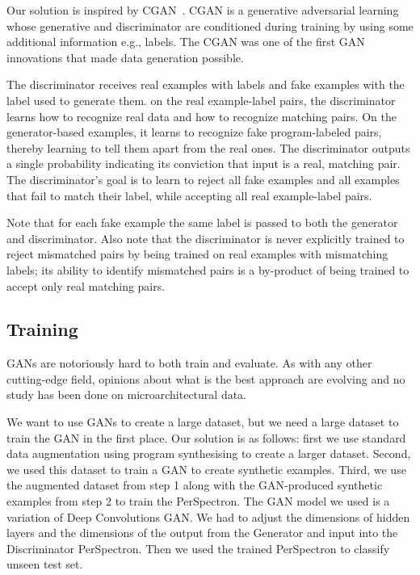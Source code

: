  Our solution is inspired by CGAN~\cite{cgan}. CGAN is a generative adversarial learning whose generative and discriminator are conditioned during training by using some additional information e.g., labels. The CGAN was one of the first GAN innovations that made data generation possible. 
 
 
 
 
 The discriminator receives real examples with labels and fake examples with the label used to generate them. on the real example-label pairs, the discriminator learns how to recognize real data and how to recognize matching pairs. On the generator-based examples, it learns to recognize fake program-labeled pairs, thereby learning to tell them apart from the real ones. The discriminator outputs a single probability indicating its conviction that input is a real, matching pair. The discriminator's goal is to learn to reject all fake examples and all examples that fail to match their label, while accepting all real example-label pairs. 
 
 Note that for each fake example the same label is passed to both the generator and discriminator. Also note that the discriminator is never explicitly trained to reject mismatched pairs by being trained on real examples with mismatching labels; its ability to identify mismatched pairs is a by-product of being trained to accept only real matching pairs. 
 

\subsection{Training}
GANs are notoriously hard to both train and evaluate. As with any other cutting-edge field, opinions about what is the best approach are evolving and no study has been done on microarchitectural data. 

We want to use GANs to create a large dataset, but we need a large dataset to train the GAN in the first place. 
Our solution is as follows:
first we use standard data augmentation using program synthesising to create a larger dataset. Second, we used this dataset to train a GAN to create synthetic examples. Third, we use the augmented dataset from step 1 along with the GAN-produced synthetic examples from step 2 to train the PerSpectron. The GAN model we used is a variation of Deep Convolutions GAN. We had to adjust the dimensions of hidden layers and the dimensions of the output from the Generator and input into the Discriminator PerSpectron. Then we used the trained PerSpectron to classify unseen test set.  

